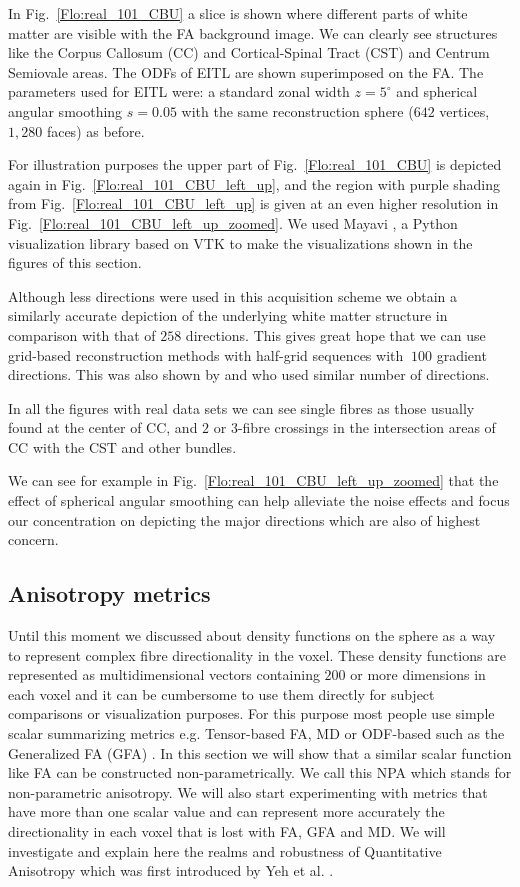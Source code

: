\documentclass{bioinfo}
\begin{document}
In Fig.~\ref{Flo:real_101_CBU} a slice is shown where different
parts of white matter are visible with the FA background image. We
can clearly see structures like the Corpus Callosum (CC) and Cortical-Spinal
Tract (CST) and Centrum Semiovale areas. The ODFs of EITL are shown
superimposed on the FA. The parameters used for EITL were: a standard
zonal width $z=5^{\circ}$ and spherical angular smoothing $s=0.05$
with the same reconstruction sphere ($642$ vertices, $1,280$ faces)
as before.

For illustration purposes the upper part of Fig.~\ref{Flo:real_101_CBU}
is depicted again in Fig.~\ref{Flo:real_101_CBU_left_up}, and the
region with purple shading from Fig.~\ref{Flo:real_101_CBU_left_up}
is given at an even higher resolution in Fig.~\ref{Flo:real_101_CBU_left_up_zoomed}.
We used Mayavi \cite{ramachandran2011mayavi}, a Python visualization
library based on VTK to make the visualizations shown in the figures
of this section.

Although less directions were used in this acquisition scheme we obtain
a similarly accurate depiction of the underlying white matter structure
in comparison with that of $258$ directions. This gives great hope
that we can use grid-based reconstruction methods with half-grid sequences
with $~100$ gradient directions. This was also shown by \cite{Kuo}
and \cite{Yeh2010} who used similar number of directions. 

In all the figures with real data sets we can see single fibres as
those usually found at the center of CC, and $2$ or $3$-fibre crossings
in the intersection areas of CC with the CST and other bundles. 

We can see for example in Fig.~\ref{Flo:real_101_CBU_left_up_zoomed}
that the effect of spherical angular smoothing can help alleviate
the noise effects and focus our concentration on depicting the major
directions which are also of highest concern. 


\subsection{Anisotropy metrics}

Until this moment we discussed about density functions on the sphere
as a way to represent complex fibre directionality in the voxel. These
density functions are represented as multidimensional vectors containing
$200$ or more dimensions in each voxel and it can be cumbersome to
use them directly for subject comparisons or visualization purposes.
For this purpose most people use simple scalar summarizing metrics
e.g. Tensor-based FA, MD or ODF-based such as the Generalized FA (GFA)
\cite{Tuch2002}. In this section we will show that a similar scalar
function like FA can be constructed non-parametrically. We call this
NPA which stands for non-parametric anisotropy. We will also start
experimenting with metrics that have more than one scalar value and
can represent more accurately the directionality in each voxel that
is lost with FA, GFA and MD. We will investigate and explain here
the realms and robustness of Quantitative Anisotropy which was first
introduced by Yeh et al. \cite{Yeh2010}.
\end{document}
